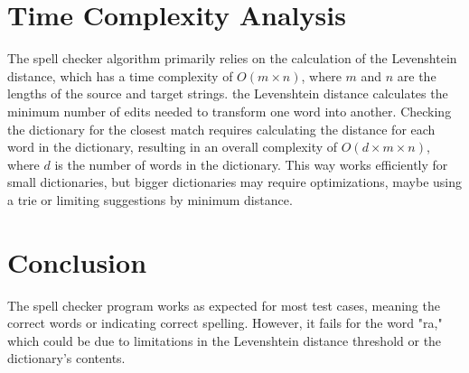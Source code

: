 \documentclass{article}
\begin{document}
\section*{Time Complexity Analysis}
The spell checker algorithm primarily relies on the calculation of the Levenshtein distance, which has a time complexity of \(O(m \times n)\), where \(m\) and \(n\) are the lengths of the source and target strings. the Levenshtein distance calculates the minimum number of edits needed to transform one word into another.
 Checking the dictionary for the closest match requires calculating the distance for each word in the dictionary, resulting in an overall complexity of \(O(d \times m \times n)\), where \(d\) is the number of words in the dictionary. This way works efficiently for small dictionaries, but bigger dictionaries may require optimizations, maybe using a trie or limiting suggestions by minimum distance.

 \section*{Conclusion}
The spell checker program works as expected for most test cases, meaning the correct words or indicating correct spelling. However, it fails for the word "ra," which could be due to limitations in the Levenshtein distance threshold or the dictionary's contents.
\end{document}

